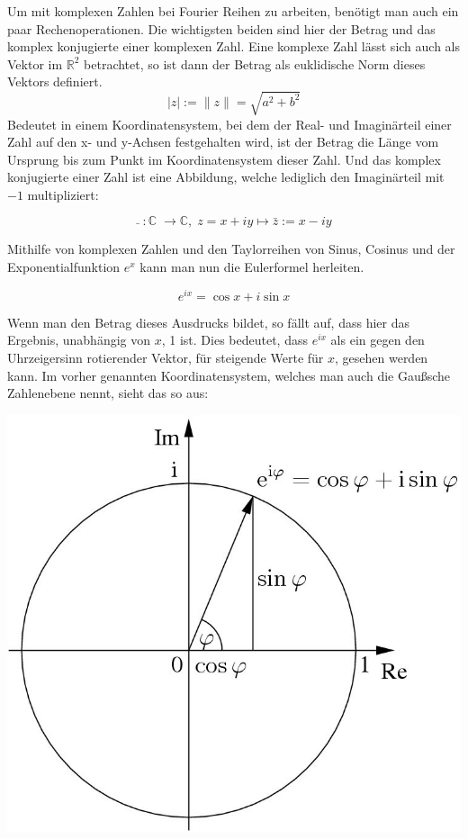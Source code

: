 \documentclass[a4paper,12pt]{article}
\theoremstyle{definition}
\theoremstyle{remark}
\begin{document}
Um mit komplexen Zahlen bei Fourier Reihen zu arbeiten, benötigt man auch ein paar Rechenoperationen. Die wichtigsten beiden sind hier der Betrag und das komplex konjugierte einer komplexen Zahl. Eine komplexe Zahl lässt sich auch als Vektor im $\mathbb{R}^2$ betrachtet, so ist dann der Betrag als euklidische Norm dieses Vektors definiert. 
$$\vert{z}\vert := \|z\| = \sqrt{ a^2 + b^2}$$
Bedeutet in einem Koordinatensystem, bei dem der Real- und Imaginärteil einer Zahl auf den x- und y-Achsen festgehalten wird, ist der Betrag die Länge vom Ursprung bis zum Punkt im Koordinatensystem dieser Zahl. 
Und das komplex konjugierte einer Zahl ist eine Abbildung, welche lediglich den Imaginärteil mit $-1$ multipliziert:

$$\bar{}\;:\mathbb{C}\;\to\mathbb{C},\; z = x+iy \mapsto \bar{z} := x-iy$$

Mithilfe von komplexen Zahlen und den Taylorreihen von Sinus, Cosinus und der Exponentialfunktion $e^x$ kann man nun die Eulerformel herleiten. 

 $$e^{ix} = \cos{x} + i\sin{x}$$

Wenn man den Betrag dieses Ausdrucks bildet, so fällt auf, dass hier das Ergebnis, unabhängig von $x$, 1 ist. Dies bedeutet, dass $e^{ix}$ als ein gegen den Uhrzeigersinn rotierender Vektor, für steigende Werte für $x$, gesehen werden kann. Im vorher genannten Koordinatensystem, welches man auch die Gaußsche Zahlenebene nennt, sieht das so aus:
\begin{center}
\includegraphics[scale=0.75]{Bilder/eulerformel.jpg}
\end{center}
\end{document}
